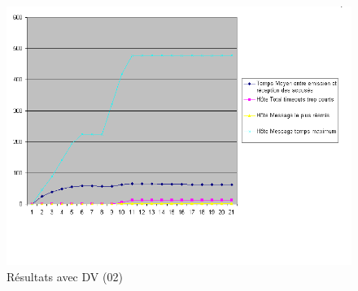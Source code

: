 \documentclass[a4paper,11pt]{article}
\begin{document}
\begin{figure}[h!t]
  \centering
    \includegraphics[scale=0.55]{avecdv2}
  \caption{Résultats avec DV (02)}
  \label{fig:avecdv02}
\end{figure}










\clearpage


\appendix
\end{document}
